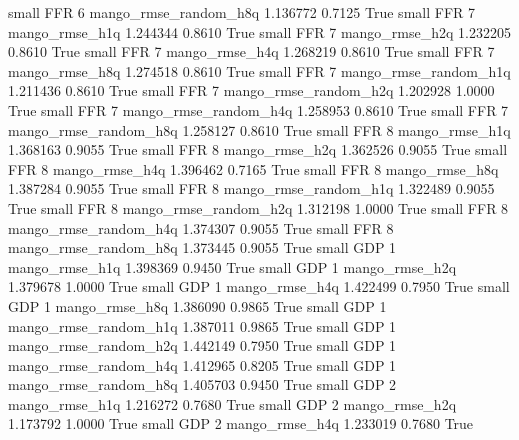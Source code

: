      small      FFR                 6 mango_rmse_random_h8q      1.136772      0.7125    True
     small      FFR                 7        mango_rmse_h1q      1.244344      0.8610    True
     small      FFR                 7        mango_rmse_h2q      1.232205      0.8610    True
     small      FFR                 7        mango_rmse_h4q      1.268219      0.8610    True
     small      FFR                 7        mango_rmse_h8q      1.274518      0.8610    True
     small      FFR                 7 mango_rmse_random_h1q      1.211436      0.8610    True
     small      FFR                 7 mango_rmse_random_h2q      1.202928      1.0000    True
     small      FFR                 7 mango_rmse_random_h4q      1.258953      0.8610    True
     small      FFR                 7 mango_rmse_random_h8q      1.258127      0.8610    True
     small      FFR                 8        mango_rmse_h1q      1.368163      0.9055    True
     small      FFR                 8        mango_rmse_h2q      1.362526      0.9055    True
     small      FFR                 8        mango_rmse_h4q      1.396462      0.7165    True
     small      FFR                 8        mango_rmse_h8q      1.387284      0.9055    True
     small      FFR                 8 mango_rmse_random_h1q      1.322489      0.9055    True
     small      FFR                 8 mango_rmse_random_h2q      1.312198      1.0000    True
     small      FFR                 8 mango_rmse_random_h4q      1.374307      0.9055    True
     small      FFR                 8 mango_rmse_random_h8q      1.373445      0.9055    True
     small      GDP                 1        mango_rmse_h1q      1.398369      0.9450    True
     small      GDP                 1        mango_rmse_h2q      1.379678      1.0000    True
     small      GDP                 1        mango_rmse_h4q      1.422499      0.7950    True
     small      GDP                 1        mango_rmse_h8q      1.386090      0.9865    True
     small      GDP                 1 mango_rmse_random_h1q      1.387011      0.9865    True
     small      GDP                 1 mango_rmse_random_h2q      1.442149      0.7950    True
     small      GDP                 1 mango_rmse_random_h4q      1.412965      0.8205    True
     small      GDP                 1 mango_rmse_random_h8q      1.405703      0.9450    True
     small      GDP                 2        mango_rmse_h1q      1.216272      0.7680    True
     small      GDP                 2        mango_rmse_h2q      1.173792      1.0000    True
     small      GDP                 2        mango_rmse_h4q      1.233019      0.7680    True
